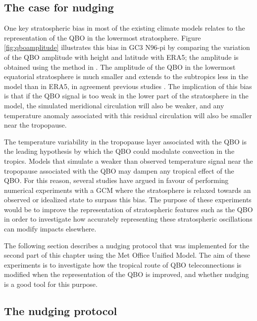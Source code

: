 \subsection{The case for nudging}

One key stratospheric bias in most of the existing climate models relates to the representation of the QBO in the lowermost stratosphere. Figure \ref{fig:qboamplitude} illustrates this bias in GC3 N96-pi by comparing the variation of the QBO amplitude  with height and latitude with ERA5; the amplitude is obtained using the method in \cite{schenzinger2017}. The amplitude of the QBO in the lowermost equatorial stratosphere is much smaller and extends to the subtropics less in the model than in ERA5, in agreement previous studies \citep{schenzinger2017,richter2020,bushell2020}. The implication of this bias is that if the QBO signal is too weak in the lower part of the stratosphere in the model, the simulated meridional circulation will also be weaker, and any temperature anomaly associated with this residual circulation will also be smaller near the tropopause. 

The temperature variability in the tropopause layer associated with the QBO is the leading hypothesis \citep[][]{collimore2003,liess2012,nie2015,gray2018} by which the QBO could modulate convection in the tropics. 
Models that simulate a weaker than observed temperature signal near the tropopause associated with the QBO may dampen any tropical effect of the QBO. For this reason, several studies have argued in favour of performing numerical experiments with a GCM where the stratosphere is relaxed towards an observed or idealized state \citep[e.g.][]{lee2018,gray2020,martin2021} to surpass this bias. The purpose of these experiments would be to improve the representation of stratospheric features such as the QBO in order to investigate how accurately representing these stratospheric oscillations can modify impacts elsewhere. 

The following section describes a nudging protocol that was implemented for the second part of this chapter using the Met Office Unified Model. The aim of these experiments is to investigate how the tropical route of QBO teleconnections is modified when the representation of the QBO is improved, and whether nudging is a good tool for this purpose.

\subsection{The nudging protocol}

